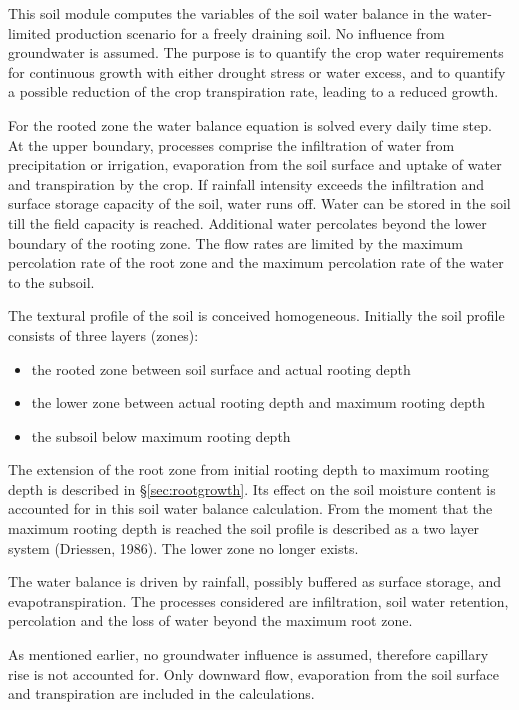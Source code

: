 This soil module computes the variables of the soil water balance in the 
water-limited production scenario for a freely draining soil. No influence from
groundwater is assumed. The purpose is to quantify the crop water requirements for
continuous growth with either drought stress or water excess, and to quantify a possible
reduction of the crop transpiration rate, leading to a reduced growth.

For the rooted zone the water balance equation is solved every daily time step. At the
upper boundary, processes comprise the infiltration of water from precipitation or
irrigation, evaporation from the soil surface and uptake of water and transpiration by the
crop. If rainfall intensity exceeds the infiltration and surface storage capacity of the soil,
water runs off. Water can be stored in the soil till the field capacity is reached. Additional
water percolates beyond the lower boundary of the rooting zone.
The flow rates are limited by the maximum percolation rate of the root zone and the
maximum percolation rate of the water to the subsoil.

The textural profile of the soil is conceived homogeneous. Initially the soil profile
consists of three layers (zones):
\begin{itemize}
	\item the rooted zone between soil surface and actual rooting depth
	\item the lower zone between actual rooting depth and maximum rooting depth
	\item the subsoil below maximum rooting depth
\end{itemize}

The extension of the root zone from initial rooting depth to maximum rooting depth is
described in \S \ref{sec:rootgrowth}. Its effect on the soil moisture content is accounted 
for in this soil water
balance calculation. From the moment that the maximum rooting depth is reached the soil
profile is described as a two layer system (Driessen, 1986). The lower zone no longer
exists.

The water balance is driven by rainfall, possibly buffered as surface storage, and
evapotranspiration. The processes considered are infiltration, soil water retention,
percolation and the loss of water beyond the maximum root zone.

As mentioned earlier, no groundwater influence is assumed, therefore capillary rise is not
accounted for. Only downward flow, evaporation from the soil surface and transpiration
are included in the calculations. 

